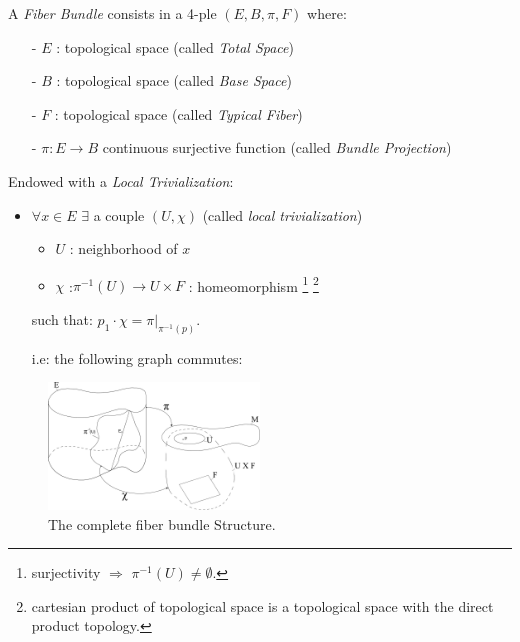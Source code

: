 \documentclass[a4paper,12pt]{scrartcl}    %
\begin{document}
\begin{definition}\label{Def:FiberBundle}
A \emph{Fiber Bundle} consists in a 4-ple $(E,B,\pi,F)$ where:
\begin{itemize}
\item[-] $E$ : topological space (called \emph{Total Space})
\item[-] $B$ : topological space (called \emph{Base Space})
\item[-] $F$ : topological space (called \emph{Typical Fiber})
\item[-] $\pi : E \rightarrow B $ continuous surjective function (called \emph{Bundle Projection})
\end{itemize}
Endowed with a \emph{Local Trivialization}:
\begin{itemize}
\item $\forall x \in E$ $\exists$ a couple $(U, \chi)$ (called \emph{local trivialization})
\begin{itemize}
\item $U$ : neighborhood of $x$
\item $\chi$ :$\pi^{-1}(U) \rightarrow U \times F$ : homeomorphism
 \footnote{surjectivity $\Rightarrow$ $\pi^{-1}(U) \neq \emptyset$.} 
 \footnote{cartesian product of topological space is a topological space with the direct product topology.}
\end{itemize}
such that: $p_1 \cdot \chi = \pi \vert_{\pi^{-1}(p)}$.

i.e: the following graph commutes:


\end{itemize}
\end{definition}

\begin{figure}[h!]
  \caption{The complete fiber bundle Structure.}
  	\includegraphics[width=0.5\textwidth]{Pictures/FiberBundle}
  \centering
\end{figure}
\end{document}

